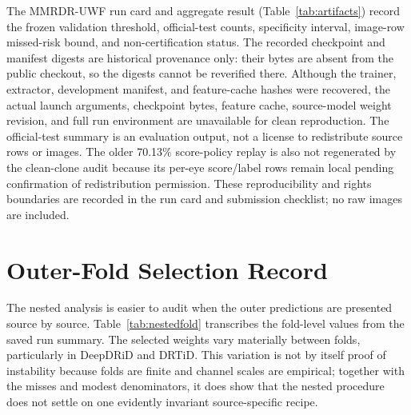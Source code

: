 \documentclass{ieeeaccess}
\begin{document}
The MMRDR-UWF run card and aggregate result (Table~\ref{tab:artifacts}) record the frozen validation threshold, official-test counts, specificity interval, image-row missed-risk bound, and non-certification status. The recorded checkpoint and manifest digests are historical provenance only: their bytes are absent from the public checkout, so the digests cannot be reverified there. Although the trainer, extractor, development manifest, and feature-cache hashes were recovered, the actual launch arguments, checkpoint bytes, feature cache, source-model weight revision, and full run environment are unavailable for clean reproduction. The official-test summary is an evaluation output, not a license to redistribute source rows or images. The older 70.13\% score-policy replay is also not regenerated by the clean-clone audit because its per-eye score/label rows remain local pending confirmation of redistribution permission. These reproducibility and rights boundaries are recorded in the run card and submission checklist; no raw images are included.

\section{Outer-Fold Selection Record}
The nested analysis is easier to audit when the outer predictions are presented source by source. Table~\ref{tab:nestedfold} transcribes the fold-level values from the saved run summary. The selected weights vary materially between folds, particularly in DeepDRiD and DRTiD. This variation is not by itself proof of instability because folds are finite and channel scales are empirical; together with the misses and modest denominators, it does show that the nested procedure does not settle on one evidently invariant source-specific recipe.
\end{document}
